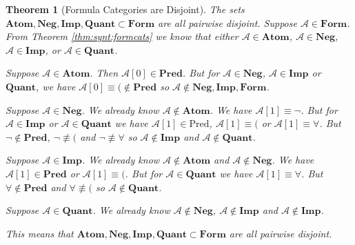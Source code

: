 \documentclass[12pt]{article}
\theoremstyle{break}
\theoremstyle{break}
\newtheorem{theorem}{Theorem}[section]
\theoremstyle{break}
\theoremstyle{break}
\theoremstyle{break}
\newtheorem{informal definition}[definition]{Informal Definition}
\newcommand{\mc}[1]{\mathcal{#1}}
\begin{document}
\begin{theorem}[Formula Categories are Disjoint]
\label{thm:read:formcatdisjoint}
The sets $\textbf{Atom}, \textbf{Neg}, \textbf{Imp}, \textbf{Quant}\subset \textbf{Form}$ are all pairwise disjoint.
Suppose $\mc{A}\in\textbf{Form}$.
From Theorem \ref{thm:synt:formcats} we know that either $\mc{A}\in\textbf{Atom}$, $\mc{A}\in\textbf{Neg}$, $\mc{A}\in\textbf{Imp}$, or $\mc{A}\in\textbf{Quant}$.

Suppose $\mc{A}\in\textbf{Atom}$. Then $\mc{A}[0] \in \textbf{Pred}$. But for $\mc{A}\in \textbf{Neg}$, $\mc{A}\in\textbf{Imp}$ or $\textbf{Quant}$, we have $\mc{A}[0] \equiv ( \not \in \textbf{Pred}$ so $\mc{A} \not \in \textbf{Neg}, \textbf{Imp}, \textbf{Form}$.

Suppose $\mc{A}\in \textbf{Neg}$.
We already know $\mc{A}\not \in \textbf{Atom}$.
We have $\mc{A}[1] \equiv \lnot$.
But for $\mc{A}\in\textbf{Imp}$ or $\mc{A}\in\textbf{Quant}$ we have $\mc{A}[1]\in \text{Pred}$, $\mc{A}[1]\equiv ($ or $\mc{A}[1]\equiv \forall$.
But $\lnot \not \in \textbf{Pred}$, $\lnot \not \equiv ($ and $\lnot\not \equiv \forall$ so $\mc{A}\not \in \textbf{Imp}$ and $\mc{A} \not \in \textbf{Quant}$.

Suppose $\mc{A} \in \textbf{Imp}$.
We already know $\mc{A} \not \in \textbf{Atom}$ and $\mc{A} \not \in \textbf{Neg}$.
We have $\mc{A}[1] \in \textbf{Pred}$ or $\mc{A}[1]\equiv ($.
But for $\mc{A} \in \textbf{Quant}$ we have $\mc{A}[1] \equiv \forall$.
But $\forall \not \in \textbf{Pred}$ and $\forall \not \equiv ($ so $\mc{A} \not \in \textbf{Quant}$.

Suppose $\mc{A}\in\textbf{Quant}$.
We already know $\mc{A} \not \in \textbf{Neg}$, $\mc{A}\not \in \textbf{Imp}$ and $\mc{A} \not \in \textbf{Imp}$.

This means that $\textbf{Atom}, \textbf{Neg}, \textbf{Imp}, \textbf{Quant}\subset \textbf{Form}$ are all pairwise disjoint.
\end{theorem}
\end{document}
